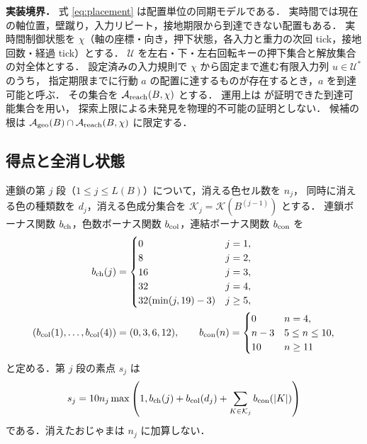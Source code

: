 \textbf{実装境界．} 式 \eqref{eq:placement} は配置単位の同期モデルである．
実時間では現在の軸位置，壁蹴り，入力リピート，接地期限から到達できない配置もある．
実時間制御状態を $\chi$（軸の座標・向き，押下状態，各入力と重力の次回 tick，接地回数・経過 tick）とする．
$\mathcal U$ を左右・下・左右回転キーの押下集合と解放集合の対全体とする．
設定済みの入力規則で $\chi$ から固定まで進む有限入力列 $u\in\mathcal U^*$ のうち，
指定期限までに行動 $a$ の配置に達するものが存在するとき，$a$ を到達可能と呼ぶ．
その集合を $\mathcal A_{\rm reach}(B,\chi)$ とする．
運用上は  が証明できた到達可能集合を用い，
探索上限による未発見を物理的不可能の証明としない．
候補の根は $\mathcal A_{\rm geo}(B)\cap\mathcal A_{\rm reach}(B,\chi)$ に限定する．

\subsection{得点と全消し状態}
連鎖の第 $j$ 段（$1\le j\le L(B)$）について，消える色セル数を $n_j$，
同時に消える色の種類数を $d_j$，消える色成分集合を $\mathcal K_j=\mathcal K(B^{(j-1)})$ とする．
連鎖ボーナス関数 $b_{\rm ch}$，色数ボーナス関数 $b_{\rm col}$，連結ボーナス関数 $b_{\rm con}$ を
\begin{align}
 b_{\rm ch}(j)&=\begin{cases}0&j=1,\\8&j=2,\\16&j=3,\\32&j=4,\\32(\min(j,19)-3)&j\ge5,\end{cases}\label{eq:chainbonus}\\
 (b_{\rm col}(1),\ldots,b_{\rm col}(4))&=(0,3,6,12),\qquad
 b_{\rm con}(n)=\begin{cases}0&n=4,\\n-3&5\le n\le10,\\10&n\ge11\end{cases}\label{eq:otherbonus}
\end{align}
と定める．第 $j$ 段の素点 $s_j$ は
\begin{equation}\label{eq:score}
 s_j=10n_j\max\left(1,b_{\rm ch}(j)+b_{\rm col}(d_j)
                       +\sum_{K\in\mathcal K_j}b_{\rm con}(|K|)\right)
\end{equation}
である．消えたおじゃまは $n_j$ に加算しない．

